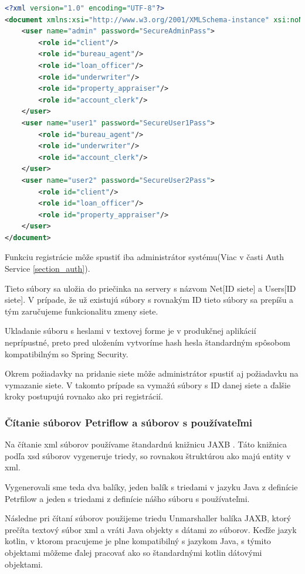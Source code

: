 \begin{lstlisting}[float, caption={Príklad súboru s používateľmi},label={alg:example_users},language=XML]
<?xml version="1.0" encoding="UTF-8"?>
<document xmlns:xsi="http://www.w3.org/2001/XMLSchema-instance" xsi:noNamespaceSchemaLocation="./users_schema.xsd">
	<user name="admin" password="SecureAdminPass">
		<role id="client"/>
		<role id="bureau_agent"/>
		<role id="loan_officer"/>
		<role id="underwriter"/>
		<role id="property_appraiser"/>
		<role id="account_clerk"/>
	</user>
	<user name="user1" password="SecureUser1Pass">
		<role id="bureau_agent"/>
		<role id="underwriter"/>
		<role id="account_clerk"/>
	</user>
	<user name="user2" password="SecureUser2Pass">
		<role id="client"/>
		<role id="loan_officer"/>
		<role id="property_appraiser"/>
	</user>
</document>
\end{lstlisting}

Funkciu registrácie môže spustiť iba administrátor systému(Viac v časti Auth Service \ref{section_auth}).

Tieto súbory sa uložia do priečinka na servery s názvom Net[ID siete] a Users[ID siete]. V prípade, že už existujú súbory s rovnakým ID tieto súbory sa prepíšu a tým zaručujeme funkcionalitu zmeny siete.

Ukladanie súboru s heslami v textovej forme je v produkčnej aplikácií neprípustné, preto pred uložením vytvoríme hash hesla štandardným spôsobom kompatibilným so Spring Security.

Okrem požiadavky na pridanie siete môže administrátor spustiť aj požiadavku na vymazanie siete. V takomto prípade sa vymažú súbory s ID danej siete a ďalšie kroky postupujú rovnako ako pri registrácií.

\subsubsection{Čítanie súborov Petriflow a súborov s používateľmi}
Na čítanie \acrshort{xml} súborov používame štandardnú knižnicu JAXB \cite{jaxb}. Táto knižnica podľa \acrshort{xsd} súborov vygeneruje triedy, so rovnakou štruktúrou ako majú entity v \acrshort{xml}.

Vygenerovali sme teda dva balíky, jeden balík s triedami v jazyku Java z definície Petrfilow a jeden s triedami z definície nášho súboru s používateľmi.

Následne pri čítaní súborov použijeme triedu Unmarshaller balíka JAXB, ktorý prečíta textový súbor \acrshort{xml} a vráti Java objekty s dátami zo súborov. Keďže jazyk kotlin, v ktorom pracujeme je plne kompatibilný s jazykom Java, s týmito objektami môžeme ďalej pracovať ako so štandardnými kotlin dátovými objektami.

